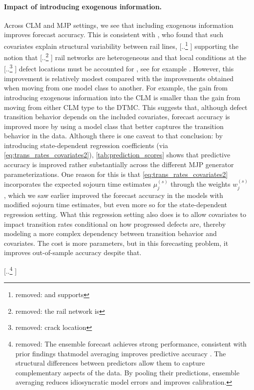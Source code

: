 \documentclass{article}
\providecommand{\DIFadd}[1]{{\protect\color{blue} \sf #1}} %
\providecommand{\DIFdel}[1]{{\protect\color{red} [..\footnote{removed: #1} ]}} %
\providecommand{\DIFaddbegin}{} %
\providecommand{\DIFaddend}{} %
\providecommand{\DIFdelbegin}{} %
\providecommand{\DIFdelend}{} %
\begin{document}
\paragraph{\DIFadd{Impact of introducing exogenous information.}}
\DIFadd{Across CLM and MJP settings, we see that including exogenous information improves forecast accuracy}\DIFaddend . This is consistent with \citet{bisgaard2024A}, who found that such covariates explain structural variability between rail lines, \DIFdelbegin \DIFdel{and supports }\DIFdelend \DIFaddbegin \DIFadd{supporting }\DIFaddend the notion that \DIFdelbegin \DIFdel{the rail network is }\DIFdelend \DIFaddbegin \DIFadd{rail networks are }\DIFaddend heterogeneous and that local conditions at the \DIFdelbegin \DIFdel{crack location }\DIFdelend \DIFaddbegin \DIFadd{defect locations }\DIFaddend must be accounted for\DIFaddbegin \DIFadd{, see for example \citet{bai2017a}.
However, this improvement is relatively modest compared with the improvements obtained when moving from one model class to another. For example, the gain from introducing exogenous information into the CLM is smaller than the gain from moving from either CLM type to the DTMC. This suggests that, although defect transition behavior depends on the included covariates, forecast accuracy is improved more by using a model class that better captures the transition behavior in the data. Although there is one caveat to that conclusion: by introducing state-dependent regression coefficients (via \cref{eq:trans_rates_covariates2}), \cref{tab:prediction_scores} shows that predictive accuracy is improved rather substantially across the different MJP generator parameterizations. One reason for this is that \cref{eq:trans_rates_covariates2} incorporates the expected sojourn time estimates $\mu_j^{(s)}$ through the weights $w_j^{(s)}$, which we saw earlier improved the forecast accuracy in the models with modified sojourn time estimates, but even more so for the state-dependent regression setting. What this regression setting also does is to allow covariates to impact transition rates conditional on how progressed defects are, thereby modeling a more complex dependency between transition behavior and covariates. The cost is more parameters, but in this forecasting problem, it improves out-of-sample accuracy despite that}\DIFaddend .


\DIFdelbegin \DIFdel{The ensemble forecast achieves strong performance, consistent with prior findings thatmodel averaging improves predictive accuracy \citep{wu2021a}. The structural differences between predictors allow them to capture complementary aspects of the data. By pooling their predictions, ensemble averaging reduces idiosyncratic model errors and improves calibration.
 }%
\end{document}
